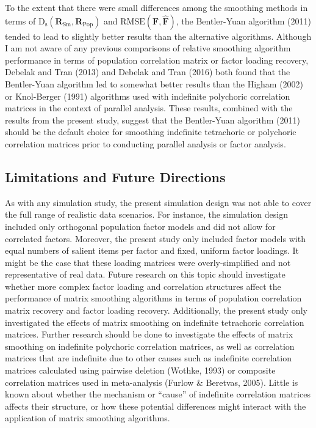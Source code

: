 \documentclass[
  english,
  man]{apa6}
\begin{document}
To the extent that there were small differences among the smoothing methods in terms of \(\mathrm{D}_{\mathrm{s}}(\mathbf{R}_{\textrm{Sm}}, \mathbf{R}_{\textrm{Pop}})\) and \(\textrm{RMSE}(\mathbf{F}, \hat{\mathbf{F}})\), the Bentler-Yuan algorithm (2011) tended to lead to slightly better results than the alternative algorithms. Although I am not aware of any previous comparisons of relative smoothing algorithm performance in terms of population correlation matrix or factor loading recovery, Debelak and Tran (2013) and Debelak and Tran (2016) both found that the Bentler-Yuan algorithm led to somewhat better results than the Higham (2002) or Knol-Berger (1991) algorithms used with indefinite polychoric correlation matrices in the context of parallel analysis. These results, combined with the results from the present study, suggest that the Bentler-Yuan algorithm (2011) should be the default choice for smoothing indefinite tetrachoric or polychoric correlation matrices prior to conducting parallel analysis or factor analysis.

\hypertarget{limitations-and-future-directions}{%
\subsection{Limitations and Future Directions}\label{limitations-and-future-directions}}

As with any simulation study, the present simulation design was not able to cover the full range of realistic data scenarios. For instance, the simulation design included only orthogonal population factor models and did not allow for correlated factors. Moreover, the present study only included factor models with equal numbers of salient items per factor and fixed, uniform factor loadings. It might be the case that these loading matrices were overly-simplified and not representative of real data. Future research on this topic should investigate whether more complex factor loading and correlation structures affect the performance of matrix smoothing algorithms in terms of population correlation matrix recovery and factor loading recovery. Additionally, the present study only investigated the effects of matrix smoothing on indefinite tetrachoric correlation matrices. Further research should be done to investigate the effects of matrix smoothing on indefinite polychoric correlation matrices, as well as correlation matrices that are indefinite due to other causes such as indefinite correlation matrices calculated using pairwise deletion (Wothke, 1993) or composite correlation matrices used in meta-analysis (Furlow \& Beretvas, 2005). Little is known about whether the mechanism or \enquote{cause} of indefinite correlation matrices affects their structure, or how these potential differences might interact with the application of matrix smoothing algorithms.
\end{document}
